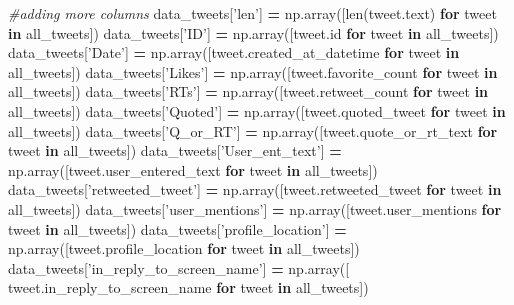 \documentclass[12pt,twoside]{reedthesis}
\newenvironment{Shaded}{\begin{snugshade}}{\end{snugshade}}
\newcommand{\KeywordTok}[1]{\textcolor[rgb]{0.13,0.29,0.53}{\textbf{#1}}}
\newcommand{\StringTok}[1]{\textcolor[rgb]{0.31,0.60,0.02}{#1}}
\newcommand{\CommentTok}[1]{\textcolor[rgb]{0.56,0.35,0.01}{\textit{#1}}}
\newcommand{\ControlFlowTok}[1]{\textcolor[rgb]{0.13,0.29,0.53}{\textbf{#1}}}
\newcommand{\OperatorTok}[1]{\textcolor[rgb]{0.81,0.36,0.00}{\textbf{#1}}}
\newcommand{\BuiltInTok}[1]{#1}
\newcommand{\NormalTok}[1]{#1}
\begin{document}
\begin{Shaded}
\begin{Highlighting}[]
    \CommentTok{#adding more columns}
\NormalTok{    data_tweets[}\StringTok{'len'}\NormalTok{]  }\OperatorTok{=}\NormalTok{ np.array([}\BuiltInTok{len}\NormalTok{(tweet.text) }
    \ControlFlowTok{for}\NormalTok{ tweet }\KeywordTok{in}\NormalTok{ all_tweets])}
\NormalTok{    data_tweets[}\StringTok{'ID'}\NormalTok{]   }\OperatorTok{=}\NormalTok{ np.array([tweet.}\BuiltInTok{id} 
    \ControlFlowTok{for}\NormalTok{ tweet }\KeywordTok{in}\NormalTok{ all_tweets])}
\NormalTok{    data_tweets[}\StringTok{'Date'}\NormalTok{] }\OperatorTok{=}\NormalTok{ np.array([tweet.created_at_datetime }
    \ControlFlowTok{for}\NormalTok{ tweet }\KeywordTok{in}\NormalTok{ all_tweets])}
\NormalTok{    data_tweets[}\StringTok{'Likes'}\NormalTok{]  }\OperatorTok{=}\NormalTok{ np.array([tweet.favorite_count }
    \ControlFlowTok{for}\NormalTok{ tweet }\KeywordTok{in}\NormalTok{ all_tweets])}
\NormalTok{    data_tweets[}\StringTok{'RTs'}\NormalTok{]    }\OperatorTok{=}\NormalTok{ np.array([tweet.retweet_count }
    \ControlFlowTok{for}\NormalTok{ tweet }\KeywordTok{in}\NormalTok{ all_tweets])}
\NormalTok{    data_tweets[}\StringTok{'Quoted'}\NormalTok{] }\OperatorTok{=}\NormalTok{ np.array([tweet.quoted_tweet }
    \ControlFlowTok{for}\NormalTok{ tweet }\KeywordTok{in}\NormalTok{ all_tweets])}
\NormalTok{    data_tweets[}\StringTok{'Q_or_RT'}\NormalTok{] }\OperatorTok{=}\NormalTok{ np.array([tweet.quote_or_rt_text }
    \ControlFlowTok{for}\NormalTok{ tweet }\KeywordTok{in}\NormalTok{ all_tweets])}
\NormalTok{    data_tweets[}\StringTok{'User_ent_text'}\NormalTok{] }\OperatorTok{=}\NormalTok{ np.array([tweet.user_entered_text }
    \ControlFlowTok{for}\NormalTok{ tweet }\KeywordTok{in}\NormalTok{ all_tweets])}
\NormalTok{    data_tweets[}\StringTok{'retweeted_tweet'}\NormalTok{] }\OperatorTok{=}\NormalTok{ np.array([tweet.retweeted_tweet }
    \ControlFlowTok{for}\NormalTok{ tweet }\KeywordTok{in}\NormalTok{ all_tweets])}
\NormalTok{    data_tweets[}\StringTok{'user_mentions'}\NormalTok{] }\OperatorTok{=}\NormalTok{ np.array([tweet.user_mentions }
    \ControlFlowTok{for}\NormalTok{ tweet }\KeywordTok{in}\NormalTok{ all_tweets])}
\NormalTok{    data_tweets[}\StringTok{'profile_location'}\NormalTok{] }\OperatorTok{=}\NormalTok{ np.array([tweet.profile_location }
    \ControlFlowTok{for}\NormalTok{ tweet }\KeywordTok{in}\NormalTok{ all_tweets])}
\NormalTok{    data_tweets[}\StringTok{'in_reply_to_screen_name'}\NormalTok{] }\OperatorTok{=}\NormalTok{ np.array([}
\NormalTok{    tweet.in_reply_to_screen_name }\ControlFlowTok{for}\NormalTok{ tweet }\KeywordTok{in}\NormalTok{ all_tweets])}

\end{Highlighting}
\end{Shaded}
\end{document}
